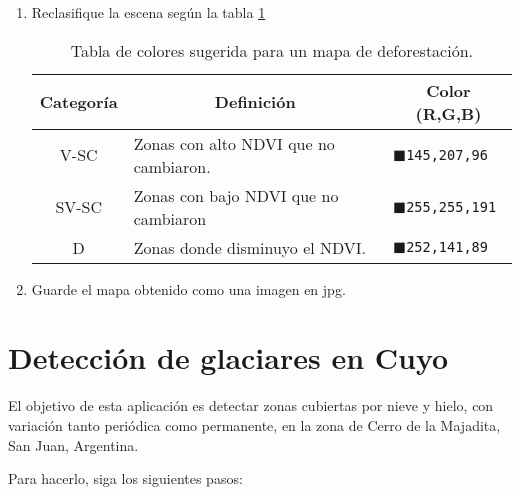 \begin{enumerate}
\item Reclasifique la escena según la tabla \ref{tab:def}

\begin{table}[]
\centering
\begin{tabular}{@{}cll@{}}
\toprule
Categoría & \multicolumn{1}{c}{Definición}        & \multicolumn{1}{c}{Color (R,G,B)}                       \\ \midrule
V-SC      & Zonas con alto NDVI que no cambiaron. & \textcolor{P1}{$\blacksquare$}\texttt{145,207,96} \\
SV-SC     & Zonas con bajo NDVI que no cambiaron  & \textcolor{P2}{$\blacksquare$}\texttt{255,255,191} \\
D         & Zonas donde disminuyo el NDVI.        & \textcolor{P3}{$\blacksquare$}\texttt{252,141,89} \\ \bottomrule
\end{tabular}
\caption{Tabla de colores sugerida para un mapa de deforestación.}
\label{tab:def}
\end{table}

\item Guarde el mapa obtenido como una imagen en jpg.

\end{enumerate}

\section{Detección de glaciares en Cuyo}

El objetivo de esta aplicación es detectar zonas cubiertas por nieve y hielo, con variación tanto periódica como permanente, en la zona de Cerro de la Majadita, San Juan, Argentina.

Para hacerlo, siga los siguientes pasos:

